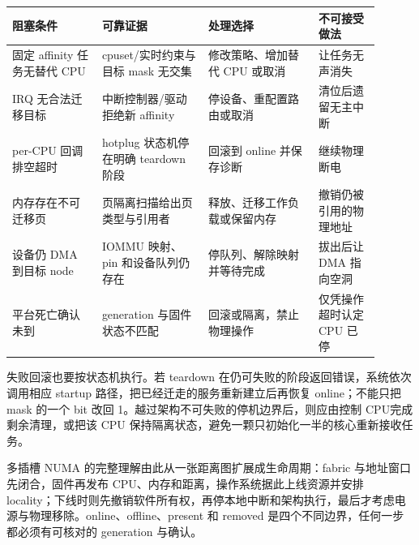 \begin{longtable}{L{0.22\linewidth}L{0.26\linewidth}L{0.27\linewidth}L{0.15\linewidth}}
\toprule
阻塞条件 & 可靠证据 & 处理选择 & 不可接受做法 \\
\midrule
固定 affinity 任务无替代 CPU & cpuset/实时约束与目标 mask 无交集 & 修改策略、增加替代 CPU 或取消 & 让任务无声消失 \\\tablerowrule
IRQ 无合法迁移目标 & 中断控制器/驱动拒绝新 affinity & 停设备、重配置路由或取消 & 清位后遗留无主中断 \\\tablerowrule
per-CPU 回调排空超时 & hotplug 状态机停在明确 teardown 阶段 & 回滚到 online 并保存诊断 & 继续物理断电 \\\tablerowrule
内存存在不可迁移页 & 页隔离扫描给出页类型与引用者 & 释放、迁移工作负载或保留内存 & 撤销仍被引用的物理地址 \\\tablerowrule
设备仍 DMA 到目标 node & IOMMU 映射、pin 和设备队列仍存在 & 停队列、解除映射并等待完成 & 拔出后让 DMA 指向空洞 \\\tablerowrule
平台死亡确认未到 & generation 与固件状态不匹配 & 回滚或隔离，禁止物理操作 & 仅凭操作超时认定 CPU 已停 \\
\bottomrule
\end{longtable}

失败回滚也要按状态机执行。若 teardown 在仍可失败的阶段返回错误，系统依次调用相应 startup 路径，把已经迁走的服务重新建立后再恢复 online；不能只把 mask 的一个 bit 改回 1。越过架构不可失败的停机边界后，则应由控制 CPU完成剩余清理，或把该 CPU 保持隔离状态，避免一颗只初始化一半的核心重新接收任务。

多插槽 NUMA 的完整理解由此从一张距离图扩展成生命周期：fabric 与地址窗口先闭合，固件再发布 CPU、内存和距离，操作系统据此上线资源并安排 locality；下线时则先撤销软件所有权，再停本地中断和架构执行，最后才考虑电源与物理移除。online、offline、present 和 removed 是四个不同边界，任何一步都必须有可核对的 generation 与确认。
